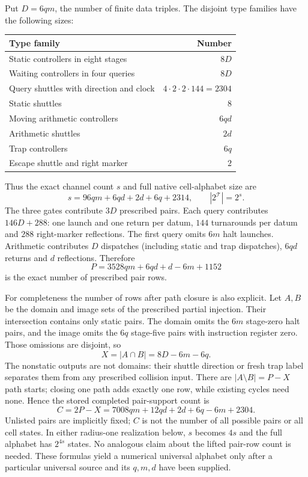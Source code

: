 \documentclass[11pt,letterpaper]{article}
\numberwithin{equation}{section}
\theoremstyle{definition}
\theoremstyle{remark}
\begin{document}
Put $D=6qm$, the number of finite data triples. The disjoint type families
have the following sizes:
\begin{center}
\begin{tabular}{@{}lr@{}}
\toprule
Type family&Number\\\midrule
Static controllers in eight stages&$8D$\\
Waiting controllers in four queries&$8D$\\
Query shuttles with direction and clock&$4\cdot2\cdot2\cdot144=2304$\\
Static shuttles&$8$\\
Moving arithmetic controllers&$6qd$\\
Arithmetic shuttles&$2d$\\
Trap controllers&$6q$\\
Escape shuttle and right marker&$2$\\\bottomrule
\end{tabular}
\end{center}
Thus the exact channel count $s$ and full native cell-alphabet size are
\[
s=96qm+6qd+2d+6q+2314,\qquad |2^{\mathcal T}|=2^s.
\]
The three gates contribute $3D$ prescribed pairs. Each query contributes
$146D+288$: one launch and one return per datum, $144$ turnarounds per
datum and $288$ right-marker reflections. The first query omits $6m$
halt launches. Arithmetic contributes $D$ dispatches (including static
and trap dispatches), $6qd$ returns and $d$ reflections. Therefore
\[
P=3528qm+6qd+d-6m+1152
\]
is the exact number of prescribed pair rows.

For completeness the number of rows after path closure is also explicit.
Let $A,B$ be the domain and image sets of the prescribed partial injection.
Their intersection contains only static pairs. The domain omits the
$6m$ stage-zero halt pairs, and the image omits the $6q$ stage-five pairs
with instruction register zero. Those omissions are disjoint, so
\[
X=|A\cap B|=8D-6m-6q.
\]
The nonstatic outputs are not domains: their shuttle direction or
fresh trap label separates them from any prescribed collision input.
There are $|A\setminus B|=P-X$ path starts; closing one path adds exactly
one row, while existing cycles need none. Hence the stored completed
pair-support count is
\[
C=2P-X=7008qm+12qd+2d+6q-6m+2304.
\]
Unlisted pairs are implicitly fixed; $C$ is not the number of all
possible pairs or all cell states. In either radius-one realization below,
$s$ becomes $4s$ and the full alphabet has $2^{4s}$ states. No analogous
claim about the lifted pair-row count is needed. These formulas yield a
numerical universal alphabet only after a particular universal source
and its $q,m,d$ have been supplied.
\end{document}
